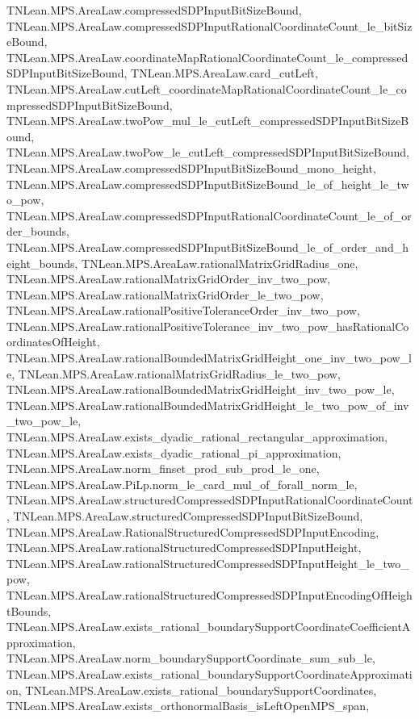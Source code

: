 \begin{lemma}
{        TNLean.MPS.AreaLaw.compressedSDPInputBitSizeBound,
        TNLean.MPS.AreaLaw.compressedSDPInputRationalCoordinateCount_le_bitSizeBound,
        TNLean.MPS.AreaLaw.coordinateMapRationalCoordinateCount_le_compressedSDPInputBitSizeBound,
        TNLean.MPS.AreaLaw.card_cutLeft,
        TNLean.MPS.AreaLaw.cutLeft_coordinateMapRationalCoordinateCount_le_compressedSDPInputBitSizeBound,
        TNLean.MPS.AreaLaw.twoPow_mul_le_cutLeft_compressedSDPInputBitSizeBound,
        TNLean.MPS.AreaLaw.twoPow_le_cutLeft_compressedSDPInputBitSizeBound,
        TNLean.MPS.AreaLaw.compressedSDPInputBitSizeBound_mono_height,
        TNLean.MPS.AreaLaw.compressedSDPInputBitSizeBound_le_of_height_le_two_pow,
        TNLean.MPS.AreaLaw.compressedSDPInputRationalCoordinateCount_le_of_order_bounds,
        TNLean.MPS.AreaLaw.compressedSDPInputBitSizeBound_le_of_order_and_height_bounds,
        TNLean.MPS.AreaLaw.rationalMatrixGridRadius_one,
        TNLean.MPS.AreaLaw.rationalMatrixGridOrder_inv_two_pow,
        TNLean.MPS.AreaLaw.rationalMatrixGridOrder_le_two_pow,
        TNLean.MPS.AreaLaw.rationalPositiveToleranceOrder_inv_two_pow,
        TNLean.MPS.AreaLaw.rationalPositiveTolerance_inv_two_pow_hasRationalCoordinatesOfHeight,
        TNLean.MPS.AreaLaw.rationalBoundedMatrixGridHeight_one_inv_two_pow_le,
        TNLean.MPS.AreaLaw.rationalMatrixGridRadius_le_two_pow,
        TNLean.MPS.AreaLaw.rationalBoundedMatrixGridHeight_inv_two_pow_le,
        TNLean.MPS.AreaLaw.rationalBoundedMatrixGridHeight_le_two_pow_of_inv_two_pow_le,
        TNLean.MPS.AreaLaw.exists_dyadic_rational_rectangular_approximation,
        TNLean.MPS.AreaLaw.exists_dyadic_rational_pi_approximation,
        TNLean.MPS.AreaLaw.norm_finset_prod_sub_prod_le_one,
        TNLean.MPS.AreaLaw.PiLp.norm_le_card_mul_of_forall_norm_le,
        TNLean.MPS.AreaLaw.structuredCompressedSDPInputRationalCoordinateCount,
        TNLean.MPS.AreaLaw.structuredCompressedSDPInputBitSizeBound,
        TNLean.MPS.AreaLaw.RationalStructuredCompressedSDPInputEncoding,
        TNLean.MPS.AreaLaw.rationalStructuredCompressedSDPInputHeight,
        TNLean.MPS.AreaLaw.rationalStructuredCompressedSDPInputHeight_le_two_pow,
        TNLean.MPS.AreaLaw.rationalStructuredCompressedSDPInputEncodingOfHeightBounds,
        TNLean.MPS.AreaLaw.exists_rational_boundarySupportCoordinateCoefficientApproximation,
        TNLean.MPS.AreaLaw.norm_boundarySupportCoordinate_sum_sub_le,
        TNLean.MPS.AreaLaw.exists_rational_boundarySupportCoordinateApproximation,
        TNLean.MPS.AreaLaw.exists_rational_boundarySupportCoordinates,
        TNLean.MPS.AreaLaw.exists_orthonormalBasis_isLeftOpenMPS_span,
}
\end{lemma}
